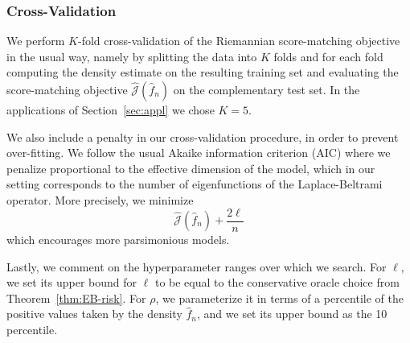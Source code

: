 \documentclass[preprint]{imsart}
\theoremstyle{plain}
\theoremstyle{definition}
\newtheorem{remark}[theorem]{Remark}
\begin{document}
\begin{appendix}
\subsubsection{Cross-Validation}

We perform $K$-fold cross-validation of the Riemannian score-matching objective in the usual way, namely by splitting the data into $K$ folds and for each fold computing the density estimate on the resulting training set and evaluating the score-matching objective $\hat{\mathcal{J}}(\hat{f}_n)$ on the complementary test set.
In the applications of Section~\ref{sec:appl} we chose $K=5$.

We also include a penalty in our cross-validation procedure, in order to prevent over-fitting.
We follow the usual Akaike information criterion (AIC) where we penalize proportional to the effective dimension of the model, which in our setting corresponds to the number of eigenfunctions of the Laplace-Beltrami operator. 
More precisely, we minimize
\begin{equation*}
\hat{\mathcal{J}}(\hat{f}_n)+
\frac{2\ell}{n}
\end{equation*}
which encourages more parsimonious models.

Lastly, we comment on the hyperparameter ranges over which we search.
For $\ell$, we set its upper bound for $\ell$ to be equal to the conservative oracle choice from Theorem~\ref{thm:EB-risk}.
For $\rho$, we parameterize it in terms of a percentile of the positive values taken by the density $\hat{f}_n$, and we set its upper bound as the 10 percentile.



\end{appendix}
\end{document}

